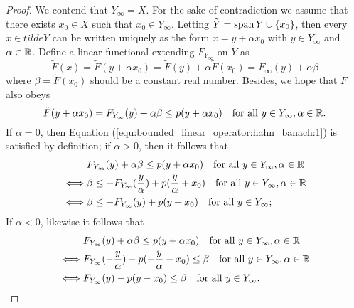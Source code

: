 \begin{proof}
We contend that $Y_\infty = X$. 
For the sake of contradiction we assume that there exists $x_0 \in X$ such 
that $x_0 \in Y_\infty$. 
Letting $\tilde Y = \operatorname{span} Y \cup \{x_0\}$, then every $x \in tilde Y$ can 
be written uniquely as the form $x = y + \alpha x_0$ with $y \in Y_\infty$ 
and $\alpha \in \mathbb{R}$. 
Define a linear functional extending $F_{Y_\infty}$ on $\tilde Y$ as 
\begin{equation*}
    \tilde F (x) = \tilde F (y + \alpha x_0) 
    = \tilde F (y) + \alpha \tilde F (x_0) 
    = F_\infty (y) + \alpha \beta
\end{equation*}
where $\beta = \tilde F(x_0)$ should be a constant real number. 
Besides, we hope that $\tilde F$ also obeys 
\begin{equation}
    \label{equ:bounded_linear_operator:hahn_banach:1}
    \tilde F(y + \alpha x_0) 
    = F_{Y_\infty} (y) + \alpha \beta 
    \le p(y + \alpha x_0) \quad 
    \text{for all } y \in Y_\infty, \alpha \in \mathbb{R}.
\end{equation}
If $\alpha = 0$, then Equation (\ref{equ:bounded_linear_operator:hahn_banach:1}) 
is satisfied by definition; 
if $\alpha > 0$, then it follows that 
\begin{equation*}
    \begin{aligned}
        &F_{Y_\infty} (y) + \alpha \beta 
        \le p(y + \alpha x_0) \quad 
        \text{for all } y \in Y_\infty, \alpha \in \mathbb{R} \\
        \iff &\beta \le -F_{Y_\infty}(\frac{y}{\alpha}) 
            + p(\frac{y}{\alpha} + x_0) \quad 
            \text{for all } y \in Y_\infty, \alpha \in \mathbb{R} \\
        \iff &\beta \le -F_{Y_\infty}(y) + p(y + x_0) \quad 
            \text{for all } y \in Y_\infty;
    \end{aligned}
\end{equation*}
If $\alpha < 0$, likewise it follows that 
\begin{equation*}
    \begin{aligned}
        &F_{Y_\infty} (y) + \alpha \beta 
        \le p(y + \alpha x_0) \quad 
        \text{for all } y \in Y_\infty, \alpha \in \bR \\
        \iff &F_{Y_\infty}(-\frac{y}{\alpha}) 
            - p(-\frac{y}{\alpha} - x_0) 
            \le \beta \quad 
            \text{for all } y \in Y_\infty, \alpha \in \bR \\
        \iff &F_{Y_\infty}(y) - p(y - x_0) 
            \le \beta \quad 
            \text{for all } y \in Y_\infty.
    \end{aligned}

\end{equation*}
\end{proof}
